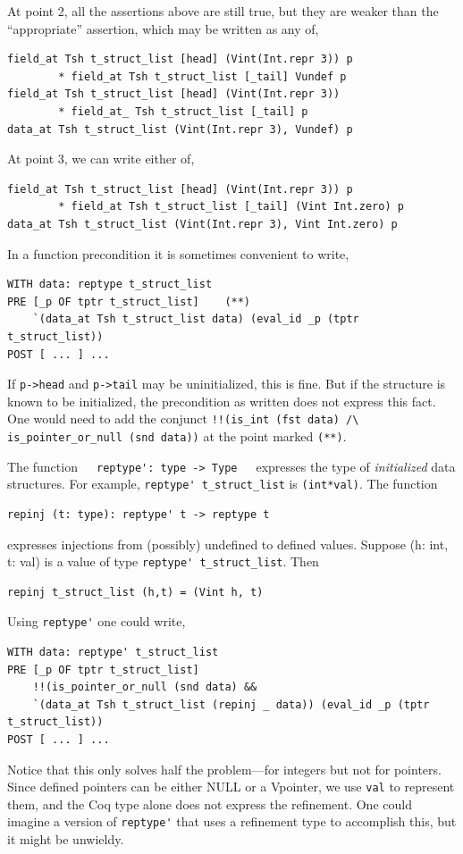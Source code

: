 \documentclass[12pt,fleqn,openany,oneside,showtrims]{memoir}
\begin{document}
At point 2, all the assertions above are still true, but
they are weaker than the ``appropriate'' assertion, which
may be written as any of,
\begin{lstlisting}
field_at Tsh t_struct_list [head] (Vint(Int.repr 3)) p
        * field_at Tsh t_struct_list [_tail] Vundef p
field_at Tsh t_struct_list [head] (Vint(Int.repr 3))
        * field_at_ Tsh t_struct_list [_tail] p
data_at Tsh t_struct_list (Vint(Int.repr 3), Vundef) p
\end{lstlisting}

At point 3, we can write either of,
\begin{lstlisting}
field_at Tsh t_struct_list [head] (Vint(Int.repr 3)) p
        * field_at Tsh t_struct_list [_tail] (Vint Int.zero) p
data_at Tsh t_struct_list (Vint(Int.repr 3), Vint Int.zero) p
\end{lstlisting}


In a function precondition it is sometimes convenient to write,
\begin{lstlisting}
WITH data: reptype t_struct_list
PRE [_p OF tptr t_struct_list]    (**)
    `(data_at Tsh t_struct_list data) (eval_id _p (tptr t_struct_list))
POST [ ... ] ...
\end{lstlisting}
If \lstinline{p->head} and
\lstinline{p->tail} may be uninitialized, this is fine.
But if the structure is known to be initialized, the precondition
as written does not express this fact.  One would need to
add the conjunct \linebreak
\lstinline{!!(is_int (fst data) /\ is_pointer_or_null (snd data))}\linebreak
at the point marked \lstinline{(**)}.

The function~~~\lstinline{reptype': type -> Type}\ \ \ expresses
the type of \emph{initialized} data structures.  For example,
\lstinline{reptype' t_struct_list} is \lstinline{(int*val)}.
The function
\begin{lstlisting}
repinj (t: type): reptype' t -> reptype t
\end{lstlisting}
expresses injections from (possibly) undefined to defined values.
Suppose (h: int, t: val) is a value of type
\lstinline{reptype' t_struct_list}.  Then
\begin{lstlisting}
repinj t_struct_list (h,t) = (Vint h, t)
\end{lstlisting}

Using \lstinline{reptype'} one could write,
\begin{lstlisting}
WITH data: reptype' t_struct_list
PRE [_p OF tptr t_struct_list]
    !!(is_pointer_or_null (snd data) &&
    `(data_at Tsh t_struct_list (repinj _ data)) (eval_id _p (tptr t_struct_list))
POST [ ... ] ...
\end{lstlisting}
Notice that this only solves half the problem---for integers but not for
pointers.  Since defined pointers can be either NULL or a Vpointer,
we use \lstinline{val} to represent them, and the Coq type alone
does not express the refinement.  One could imagine
a version of \lstinline{reptype'} that uses a refinement type
to accomplish this, but it might be unwieldy.
\end{document}
